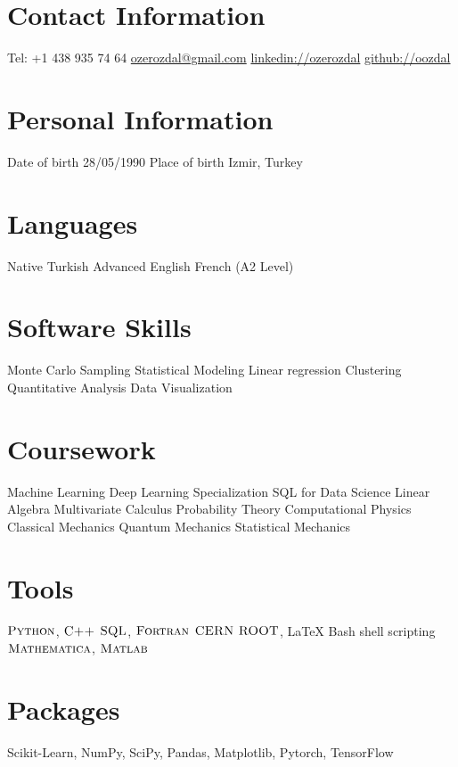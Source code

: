 \documentclass[]{friggeri-cv}
\begin{document}


\begin{aside}
  \section{Contact Information}
    Tel: +1 438 935 74 64
    \href{mailto:ozerozdal@gmail.com}{ozerozdal@gmail.com}
    \href{http://www.linkedin.com/in/ozerozdal/}{linkedin://ozerozdal}
    \href{http://github.com/oozdal}{github://oozdal}
  \section{Personal Information}
  	\bullet Date of birth 
  	28/05/1990
  	\bullet Place of birth
  	Izmir, Turkey
  \section{Languages}
    Native Turkish
    Advanced English 
    French (A2 Level)
  \section{Software Skills}
    Monte Carlo Sampling
    Statistical Modeling
    Linear regression
	Clustering     
    Quantitative Analysis    
    Data Visualization
  \section{Coursework}  
  \bullet Machine Learning
  \bullet Deep Learning Specialization
  \bullet SQL for Data Science
  \bullet Linear Algebra
  \bullet Multivariate Calculus
  \bullet Probability Theory
  \bullet Computational Physics    
  \bullet Classical Mechanics
  \bullet Quantum Mechanics
  \bullet Statistical Mechanics
    \section{Tools}
    $\textsc{Python}$, $\textsc{C++}$ 
    $\textsc{SQL}$, $\textsc{Fortran}$
    $\textsc{CERN ROOT}$, LaTeX   
    Bash shell scripting
    $\textsc{Mathematica}$,  $\textsc{Matlab}$
    \section{Packages}  
    Scikit-Learn,
    NumPy, SciPy,
    Pandas, Matplotlib,
    Pytorch, TensorFlow    
\end{aside}
\end{document}
